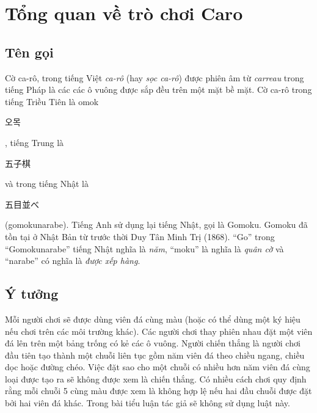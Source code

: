 \chapter{Tổng quan về trò chơi Caro}
\setlength{\epigraphwidth}{0.5\textwidth}

\section{Tên gọi}

Cờ ca-rô, trong tiếng Việt \emph{ca-rô} (hay \textit{sọc ca-rô}) được phiên âm từ \emph{carreau} trong tiếng Pháp là các các ô vuông được sắp đều trên một mặt bề mặt. Cờ ca-rô trong tiếng Triều Tiên là omok\begin{CJK*}{UTF8}{mj} 오목 \end{CJK*}, tiếng Trung là\begin{CJK*}{UTF8}{gbsn} 五子棋 \end{CJK*} và trong tiếng Nhật là \begin{CJK*}{UTF8}{min}五目並べ\end{CJK*} (gomokunarabe). Tiếng Anh sử dụng lại tiếng Nhật, gọi là Gomoku. Gomoku đã tồn tại ở Nhật Bản từ trước thời Duy Tân Minh Trị (1868). ``Go'' trong ``Gomokunarabe'' tiếng Nhật nghĩa là \emph{năm}, ``moku'' là nghĩa là \emph{quân cờ} và ``narabe'' có nghĩa là \emph{được xếp hàng}.

\section{Ý tưởng}

Mỗi người chơi sẽ được dùng viên đá cùng màu (hoặc có thể dùng một ký hiệu nếu chơi trên các môi trường khác). Các người chơi thay phiên nhau đặt một viên đá lên trên một bảng trống có kẻ các ô vuông. Người chiến thắng là người chơi đầu tiên tạo thành một chuỗi liên tục gồm năm viên đá theo chiều ngang, chiều dọc hoặc đường chéo. Việc đặt sao cho một chuỗi có nhiều hơn năm viên đá cùng loại được tạo ra sẽ không được xem là chiến thắng. Có nhiều cách chơi quy định rằng mỗi chuỗi 5 cùng màu được xem là không hợp lệ nếu hai đầu chuỗi được đặt bởi hai viên đá khác. Trong bài tiểu luận tác giả sẽ không sử dụng luật này.